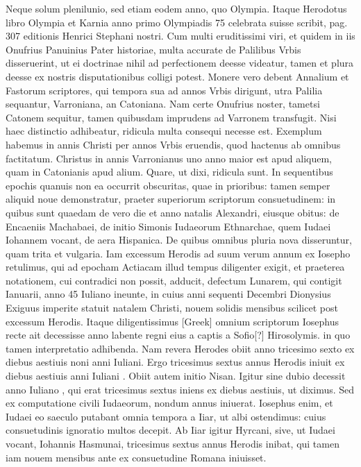 Neque solum plenilunio, sed etiam eodem anno, quo
Olympia.
Itaque Herodotus libro  Olympia et Karnia anno primo
Olympiadis 75 celebrata suisse scribit, pag. 307 editionis Henrici
Stephani nostri.
Cum multi eruditissimi viri, et quidem in iis
Onufrius Panuinius Pater historiae, multa accurate de Palilibus Vrbis
disseruerint, ut ei doctrinae nihil ad perfectionem deesse videatur,
tamen et plura deesse ex nostris disputationibus colligi potest.
Monere vero debent Annalium et Fastorum scriptores, qui tempora
sua ad annos Vrbis dirigunt, utra Palilia sequantur, Varroniana,
an Catoniana.
Nam certe Onufrius noster, tametsi Catonem sequitur,
tamen quibusdam imprudens ad Varronem transfugit.
Nisi
haec distinctio adhibeatur, ridicula multa consequi necesse est.
Exemplum habemus in annis Christi per annos Vrbis eruendis,
quod hactenus ab omnibus factitatum.
Christus in annis Varronianus
uno anno maior est apud aliquem, quam in Catonianis apud alium.
Quare, ut dixi, ridicula sunt.
In sequentibus epochis quanuis
non ea occurrit obscuritas, quae in prioribus: tamen semper aliquid
noue demonstratur, praeter superiorum scriptorum consuetudinem:
in quibus sunt quaedam de vero die et anno natalis Alexandri, eiusque
obitus: de Encaeniis Machabaei, de initio Simonis Iudaeorum
Ethnarchae, quem Iudaei Iohannem vocant, de aera Hispanica.
De quibus omnibus pluria nova disseruntur, quam trita et vulgaria.
Iam
excessum Herodis ad suum verum annum ex Iosepho retulimus,
qui ad epocham Actiacam illud tempus diligenter exigit, et praeterea
notationem, cui contradici non possit, adducit, defectum Lunarem,
qui contigit  Ianuarii, anno 45 Iuliano ineunte, in cuius
anni sequenti Decembri Dionysius Exiguus imperite statuit natalem
Christi, nouem solidis mensibus scilicet post excessum Herodis.
Itaque diligentissimus \textgreek{[Greek]} omnium scriptorum Iosephus
recte ait decessisse  anno labente regni eius a captis a Sofio[?]
Hirosolymis. in quo tamen interpretatio adhibenda.
Nam revera Herodes
obiit anno tricesimo sexto ex diebus aestiuis noni anni Iuliani.
Ergo tricesimus sextus annus Herodis iniuit ex diebus aestiuis anni
Iuliani .
Obiit autem initio Nisan.
Igitur sine dubio decessit
anno Iuliano , qui erat tricesimus sextus iniens ex diebus aestiuis,
ut diximus.
Sed ex computatione civili Iudaeorum, nondum
 annus iniuerat.
Iosephus enim, et Iudaei eo saeculo putabant
omnia tempora a  Iiar, ut albi ostendimus: cuius consuetudinis
ignoratio multos decepit.
Ab Iiar igitur Hyrcani, sive, ut Iudaei
vocant, Iohannis Hasmunai, tricesimus sextus annus Herodis inibat,
qui tamen iam nouem mensibus ante ex consuetudine Romana iniuisset.

